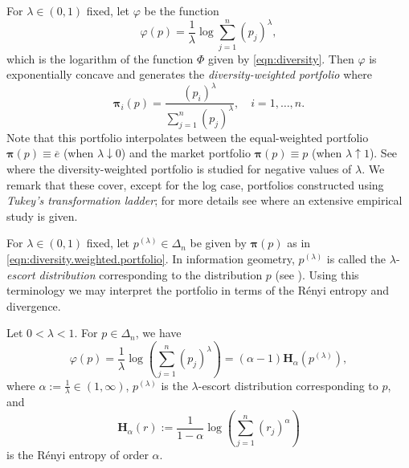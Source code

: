 \documentclass[graybox]{svmult}
\begin{document}
\begin{example} \label{eg:diversity}
For $\lambda \in (0, 1)$ fixed, let $\varphi$ be the function
\[
\varphi(p) = \frac{1}{\lambda} \log \sum_{j = 1}^n (p_j)^{\lambda},
\]
which is the logarithm of the function $\Phi$ given by \eqref{eqn:diversity}. Then $\varphi$ is exponentially concave and generates the {\it diversity-weighted portfolio} where
\begin{equation} \label{eqn:diversity.weighted.portfolio}
\boldsymbol{\pi}_i(p) = \frac{(p_i)^{\lambda}}{\sum_{j = 1}^n (p_j)^{\lambda}}, \quad i = 1, \ldots, n.
\end{equation}
Note that this portfolio interpolates between the equal-weighted portfolio $\boldsymbol{\pi}(p) \equiv \overline{e}$ (when $\lambda \downarrow 0$) and the market portfolio $\boldsymbol{\pi}(p) \equiv p$ (when $\lambda \uparrow 1$). See \cite{VK15} where the diversity-weighted portfolio is studied for negative values of $\lambda$. We remark that these cover, except for the log case, portfolios constructed using {\it Tukey's transformation ladder}; for more details see \cite{ETM17} where an extensive empirical study is given.


For $\lambda \in (0, 1)$ fixed, let $p^{(\lambda)} \in \Delta_n$ be given by $\boldsymbol{\pi}(p)$ as in \eqref{eqn:diversity.weighted.portfolio}. In information geometry, $p^{(\lambda)}$ is called the $\lambda$-{\it escort distribution} corresponding to the distribution $p$ (see \cite[Section 4.3]{A16}). Using this terminology we may interpret the portfolio in terms of the R\'{e}nyi entropy and divergence.

\begin{proposition}
Let $0 < \lambda < 1$. For $p \in \Delta_n$, we have
\[
\varphi(p) = \frac{1}{\lambda} \log \left( \sum_{j = 1}^n (p_j)^{\lambda} \right) = (\alpha - 1) \mathbf{H}_{\alpha} (p^{(\lambda)}),
\]
where $\alpha := \frac{1}{\lambda} \in (1, \infty)$, $p^{(\lambda)}$ is the $\lambda$-escort distribution corresponding to $p$, and 
\[
\mathbf{H}_{\alpha}(r) := \frac{1}{1 - \alpha} \log \left( \sum_{j = 1}^n (r_j)^{\alpha}\right)
\]
is the R\'{e}nyi entropy of order $\alpha$.


\end{proposition}
\end{example}
\end{document}
